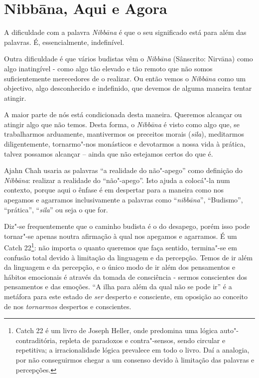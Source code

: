 \chapter{Nibbāna, Aqui e Agora}

A dificuldade com a palavra \emph{Nibbāna} é que o seu significado está
para além das palavras. É, essencialmente, indefinível.

Outra dificuldade é que vários budistas vêm o \emph{Nibbāna} (Sânscrito:
Nirvāna) como algo inatingível - como algo tão elevado e tão remoto que
não somos suficientemente merecedores de o realizar. Ou então vemos o
\emph{Nibbāna} como um objectivo, algo desconhecido e indefinido, que
devemos de alguma maneira tentar atingir.

A maior parte de nós está condicionada desta maneira. Queremos alcançar
ou atingir algo que não temos. Desta forma, o \emph{Nibbāna} é visto
como algo que, se trabalharmos arduamente, mantivermos os preceitos
morais (\emph{sila}), meditarmos diligentemente, tornarmo"-nos monásticos
e devotarmos a nossa vida à prática, talvez possamos alcançar -- ainda
que não estejamos certos do que é.

Ajahn Chah usaria as palavras ``a realidade do não"-apego'' como
definição do \emph{Nibbāna}: realizar a realidade do ``não"-apego''. Isto
ajuda a colocá"-la num contexto, porque aqui o ênfase é em despertar para
a maneira como nos apegamos e agarramos inclusivamente a palavras como
``\emph{nibbāna}'', ``Budismo'', ``prática'', ``\emph{sila}'' ou seja o
que for.

Diz"-se frequentemente que o caminho budista é o do desapego, porém isso
pode tornar"-se apenas noutra afirmação à qual nos apegamos e agarramos.
É um Catch 22\footnote{%
Catch 22 é um livro de Joseph Heller, onde predomina uma lógica
auto"-contraditória, repleta de paradoxos e contra"-sensos, sendo circular
e repetitiva; a irracionalidade lógica prevalece em todo o livro. Daí a
analogia, por não conseguirmos chegar a um consenso devido à limitação
das palavras e percepções.}:
não importa o quanto queremos que faça sentido,
termina"-se em confusão total devido à limitação da linguagem e da
percepção. Temos de ir além da linguagem e da percepção, e o único modo
de ir além dos pensamentos e hábitos emocionais é através da tomada de
consciência - sermos conscientes dos pensamentos e das emoções. ``A ilha
para além da qual não se pode ir'' é a metáfora para este estado de
\emph{ser} desperto e consciente, em oposição ao conceito de nos
\emph{tornarmos} despertos e conscientes.

